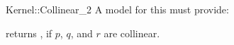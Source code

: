 \begin{ccRefFunctionObjectConcept}{Kernel::Collinear_2}
A model for this must provide:


{returns , if $p$, $q$, and $r$ are collinear.}

\end{ccRefFunctionObjectConcept}
